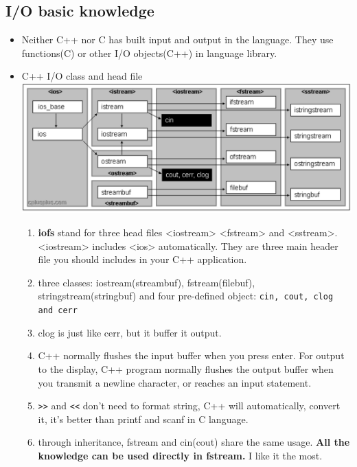 \documentclass[a4paper,11pt,twoside]{book}
\begin{document}
\subsection{I/O basic knowledge}
\begin{itemize}
	\item Neither C++ nor C has built input and output in the language. They use functions(C) or other I/O objects(C++) in language library.
	
	\item C++ I/O class and head file \\
	\includegraphics[scale=0.45]{pics/io.png}
	\begin{enumerate}
		
		\item \textbf{iofs} stand for three head files <iostream> <fstream> and <sstream>. <iostream> includes <ios> automatically. They are three main header file you should includes in your C++ application.
		
		\item three classes: iostream(streambuf), fstream(filebuf), stringstream(stringbuf) and four pre-defined object: \texttt{cin, cout, clog and cerr} 
		
		\item clog is just like cerr, but it buffer it output.
		
		\item C++ normally flushes the input buffer when you press enter. For output to the display, C++ program normally flushes the output buffer when you transmit a newline character, or reaches an input statement.
		
		\item \verb=>>= and \verb=<<= don't need to format string,  C++ will automatically,  convert it, it's better than printf and scanf in C language.
		
		\item through inheritance, fstream and cin(cout) share the same usage. \textbf{All the knowledge can be used directly in fstream.} I like it the most.
	\end{enumerate}
	
\end{itemize}
\end{document}
